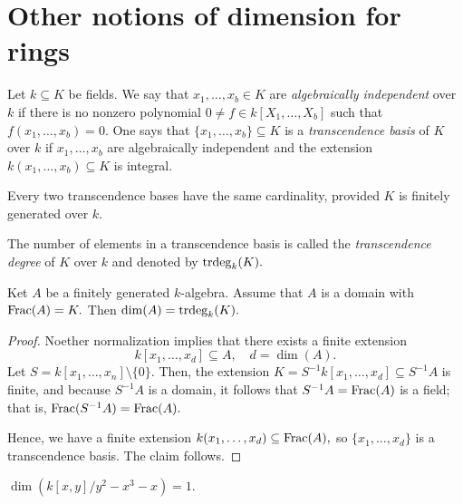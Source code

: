 \section{Other notions of dimension for rings}
\begin{df}
  Let \(k \subseteq K\) be fields. We say that \(x_1, \dotsc, x_b \in K\) are \emph{algebraically independent} over \(k\) if there is no nonzero polynomial
  \(0 \neq f \in k[X_1, \dotsc, X_b]\)
  such that \(f(x_1, \dotsc, x_b) = 0.\)
  One says that
  \(\{x_1, \dotsc, x_b\} \subseteq K\) is a \emph{transcendence basis} of \(K\) over \(k\) if \(x_1, \dotsc, x_b\) are algebraically independent and the extension
  \(k(x_1, \dotsc, x_b) \subseteq K\)
  is integral.
\end{df}

\begin{lemma}
  Every two transcendence bases have the same cardinality, provided \(K\) is finitely generated over \(k.\)
\end{lemma}

\begin{df}
  The number of elements in a transcendence basis is called the \emph{transcendence degree} of \(K\) over \(k\) and denoted by
  \(\mathrm{trdeg}_k(K).\)
\end{df}

\begin{theorem}
  Ket \(A\) be a finitely generated \(k\)-algebra. Assume that \(A\) is a domain with \(\mathrm{Frac}(A) = K.\) Then
  \(\dim(A) = \mathrm{trdeg}_k(K).\)
\end{theorem}
\begin{proof}
  Noether normalization implies that there exists a finite extension
  \[k[x_1, \dotsc, x_d] \subseteq A, \quad d = \dim(A).\]
  Let \(S = k[x_1, \dotsc, x_n] \setminus \{0\}.\)
  Then, the extension
  \(K = S^{-1}k[x_1, \dotsc, x_d] \subseteq S^{-1}A\)
  is finite, and because \(S^{-1}A\) is a domain, it follows that \(S^{-1}A = \mathrm{Frac}(A)\) is a field; that is, \(\mathrm{Frac}(S^{-1}A) = \mathrm{Frac}(A).\)

  Hence, we have a finite extension
  \(k(x_1, \dotsc, x_d) \subseteq \mathrm{Frac}(A),\)
  so \(\{x_1, \dotsc, x_d\}\) is a transcendence basis. The claim follows.
\end{proof}

\begin{example}
  \(\dim(k[x,y] / {y^2-x^3-x}) = 1\).
\end{example}


